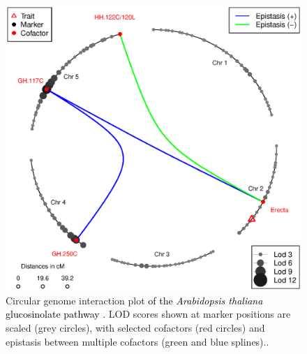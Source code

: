 \begin{figure}[h!]
  \centering
  \includegraphics[keepaspectratio,scale=0.30]{eps/image_3_1.eps}
  \caption[Circle plot.]{Circular genome interaction plot \textcolor{black}{of the {\it Arabidopsis 
  		  thaliana} glucosinolate pathway} \citep{Fu:2007}.  LOD scores shown at marker positions 
  		  are scaled (grey circles), with selected cofactors (red circles) and epistasis between 
  		  multiple cofactors (green and blue splines)..}
  \label{fig:circleplot}
\end{figure}

